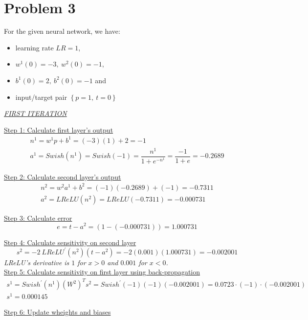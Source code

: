 \section{Problem 3}

For the given neural network, we have:
\begin{itemize}
	\item learning rate $LR = 1$,
	\item $w^1\left(0\right) = -3,\ w^2\left(0\right) = -1$,
	\item $b^1\left(0\right) = 2,\ b^2\left(0\right) = -1$ and
	\item input/target pair $\left\{p=1,\ t=0\right\}$
\end{itemize}
\vspace*{1mm}

\begin{center}
	\underline{\textit{FIRST ITERATION}}
\end{center}

\underline{Step 1: Calculate first layer's output}
\[
\begin{gathered}
n^1 = w^1 p + b^1 = (-3)(1) + 2 = -1\\
a^1 = {Swish}\left(n^1\right) = {Swish}\left(-1\right) = \dfrac{n^1}{1+e^{-n^1}} = \dfrac{-1}{1+e} = -0.2689
\end{gathered}
\]

\underline{Step 2: Calculate second layer's output}
\[
\begin{gathered}
n^2 = w^2 a^1 + b^2 = (-1)(-0.2689) + (-1) = -0.7311 \\ 
a^2 = {LReLU}\left(n^2\right) = {LReLU}\left(-0.7311\right) = -0.000731
\end{gathered}
\]

\underline{Step 3: Calculate error}
\[
e = t-a^2 = \left(1-\left(-0.000731\right)\right) = 1.000731
\]

\underline{Step 4: Calculate sensitivity on second layer}
\[
s^2 = -2\ {LReLU}^{'}\left(n^2\right)\left(t-a^2\right) = -2 \left(0.001\right) \left(1.000731\right) = -0.002001
\]
\textit{\small LReLU's derivative is $1$ for $x>0$ and $0.001$ for $x<0$.}\\ 

\underline{Step 5: Calculate sensitivity on first layer using back-propagation}
\[
\begin{gathered}
s^1 = Swish^{'} \left(n^1\right) \left(W^2\right)^T s^2 = Swish^{'} \left(-1\right) \left(-1\right) \left(-0.002001\right) = 0.0723 \cdot (-1) \cdot \left(-0.002001\right) \\
s^1 = 0.000145
\end{gathered}
\]

\underline{Step 6: Update wheights and biases}
\[
\begin{gathered}
\end{gathered}
\]

